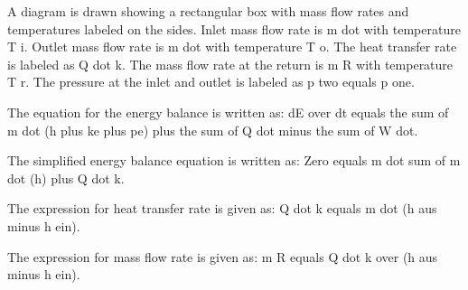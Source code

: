 A diagram is drawn showing a rectangular box with mass flow rates and temperatures labeled on the sides. Inlet mass flow rate is m dot with temperature T i. Outlet mass flow rate is m dot with temperature T o. The heat transfer rate is labeled as Q dot k. The mass flow rate at the return is m R with temperature T r. The pressure at the inlet and outlet is labeled as p two equals p one.

The equation for the energy balance is written as:
dE over dt equals the sum of m dot (h plus ke plus pe) plus the sum of Q dot minus the sum of W dot.

The simplified energy balance equation is written as:
Zero equals m dot sum of m dot (h) plus Q dot k.

The expression for heat transfer rate is given as:
Q dot k equals m dot (h aus minus h ein).

The expression for mass flow rate is given as:
m R equals Q dot k over (h aus minus h ein).